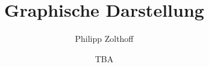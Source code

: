 

\author{Philipp Zolthoff}
\title{Graphische Darstellung}
\date{TBA}



\maketitle

\tableofcontents
\newpage







